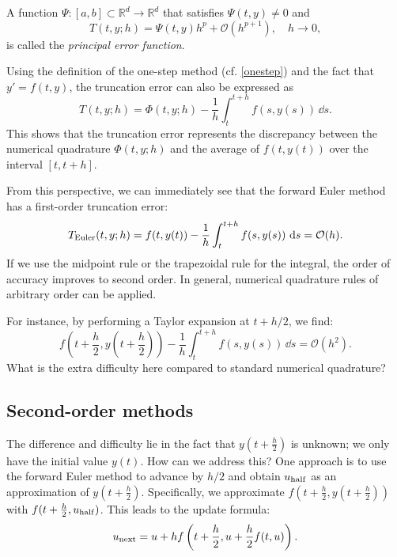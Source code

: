 \documentclass[10pt]{amsart}
\begin{document}
\begin{definition}
A function $\Psi: [a, b] \subset \mathbb{R}^d \to \mathbb{R}^d$ that satisfies $\Psi(t, y) \neq 0$ and  
\begin{equation}\label{eq:principal_error}
T(t, y; h) = \Psi(t, y) h^p + \mathcal{O}(h^{p+1}), \quad h \to 0,  
\end{equation}  
is called the \emph{principal error function}.
\end{definition}

Using the definition of the one-step method (cf. \eqref{onestep}) and the fact that $y' = f(t, y)$, the truncation error can also be expressed as  
\begin{equation}\label{eq:Tphi}  
T(t, y; h) = \Phi(t, y; h) - \frac{1}{h} \int_{t}^{t+h} f(s, y(s)) \, \dd s.  
\end{equation}  
This shows that the truncation error represents the discrepancy between the numerical quadrature $\Phi(t, y; h)$ and the average of $f(t, y(t))$ over the interval $[t, t+h]$.  

From this perspective, we can immediately see that the forward Euler method has a first-order truncation error:  
$$  
T_{\rm Euler}(t, y; h) = f(t, y(t)) - \frac{1}{h} \int_{t}^{t+h} f(s, y(s)) \, \,{\rm d} s = \mathcal{O}(h).  
$$  
If we use the midpoint rule or the trapezoidal rule for the integral, the order of accuracy improves to second order. In general, numerical quadrature rules of arbitrary order can be applied.  

For instance, by performing a Taylor expansion at $t + h/2$, we find:  
$$  
f\left(t + \frac{h}{2}, y\left(t + \frac{h}{2}\right)\right) - \frac{1}{h} \int_{t}^{t+h} f(s, y(s)) \, \dd s = \mathcal{O}(h^2).  
$$  
What is the extra difficulty here compared to standard numerical quadrature?  

\subsection{Second-order methods}
The difference and difficulty lie in the fact that $y(t + \frac{h}{2})$ is unknown; we only have the initial value $y(t)$. How can we address this? One approach is to use the forward Euler method to advance by $h/2$ and obtain $u_{\rm half}$ as an approximation of $y(t + \frac{h}{2})$. Specifically, we approximate $f(t + \frac{h}{2}, y(t + \frac{h}{2}))$ with $f(t + \frac{h}{2}, u_{\rm half})$. This leads to the update formula:  
$$  
u_{\rm next} = u + h f\left(t + \frac{h}{2}, u + \frac{h}{2} f(t, u)\right).  
$$  
\end{document}

